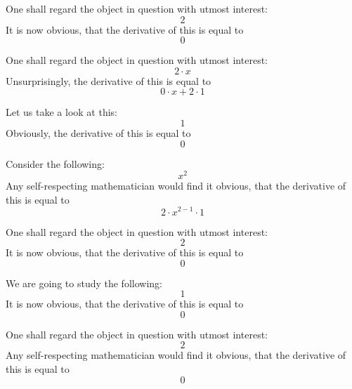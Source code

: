 \documentclass{article}
\begin{document}
One shall regard the object in question with utmost interest:
\begin{equation}
2 
\end{equation}
It is now obvious, that the derivative of this is equal to
\begin{equation}
0 
\end{equation}

One shall regard the object in question with utmost interest:
\begin{equation}
2 \cdot x 
\end{equation}
Unsurprisingly, the derivative of this is equal to
\begin{equation}
0 \cdot x + 2 \cdot 1 
\end{equation}

Let us take a look at this:
\begin{equation}
1 
\end{equation}
Obviously, the derivative of this is equal to
\begin{equation}
0 
\end{equation}

Consider the following:
\begin{equation}
x ^{2 } 
\end{equation}
Any self-respecting mathematician would find it obvious, that the derivative of this is equal to
\begin{equation}
2 \cdot x ^{2 - 1 } \cdot 1 
\end{equation}

One shall regard the object in question with utmost interest:
\begin{equation}
2 
\end{equation}
It is now obvious, that the derivative of this is equal to
\begin{equation}
0 
\end{equation}

We are going to study the following:
\begin{equation}
1 
\end{equation}
It is now obvious, that the derivative of this is equal to
\begin{equation}
0 
\end{equation}

One shall regard the object in question with utmost interest:
\begin{equation}
2 
\end{equation}
Any self-respecting mathematician would find it obvious, that the derivative of this is equal to
\begin{equation}
0 
\end{equation}
\end{document}
